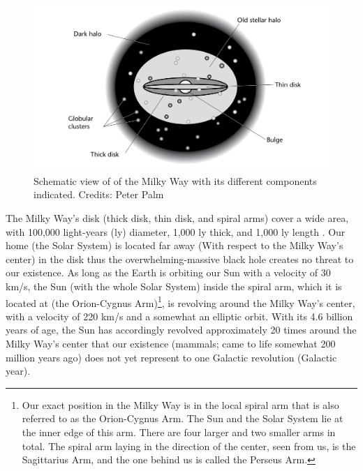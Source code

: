\vspace{5mm}
\begin{figure}[!ht]
\centering
\includegraphics[width=\textwidth, angle=0]{Img/milkyway.png}
\caption{Schematic view of of the Milky Way with its different components indicated. Credits: Peter Palm} 
\label{milkyway}
\end{figure}


\vspace{5mm}


The Milky Way's disk (thick disk, thin disk, and spiral arms)  cover a wide area, with 100,000 light-years (ly) diameter, 1,000 ly thick, and 1,000 ly length \citep{2019A&A...625A.105H}. Our home (the Solar System) is located far away (With respect to the Milky Way's center) in the disk thus the overwhelming-massive black hole creates no threat to our existence. As long as the Earth is orbiting our Sun with a velocity of 30 km/s, the Sun (with the whole Solar System) inside the spiral arm, which it is located at (the Orion-Cygnus Arm)\footnote{Our exact position in the Milky Way is in the local spiral arm that is also referred to as the Orion-Cygnus Arm. The Sun and the Solar System lie at the inner edge of this arm. There are four larger and two smaller arms in total. The spiral arm laying in the direction of the center, seen from us, is the Sagittarius Arm, and the one behind us is called the Perseus Arm.}, is revolving around the Milky Way's center, with a velocity of 220 km/s and a somewhat an elliptic orbit. With its 4.6 billion years of age, the Sun has accordingly revolved approximately 20 times around the Milky Way's center that our existence (mammals; came to life somewhat 200 million years ago) does not yet represent to one Galactic revolution (Galactic year). 

